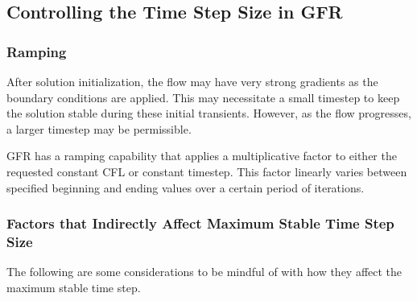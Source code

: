 \subsection{Controlling the Time Step Size in GFR}
\label{SEC:Time:Controlling}


\subsubsection{Ramping}
\label{SEC:Time:Controlling:Ramping}


After solution initialization, the flow may have very strong gradients
as the boundary conditions are applied.
%
This may necessitate a small timestep to keep the solution stable
during these initial transients.
%
However, as the flow progresses, a larger timestep may be permissible.

GFR has a ramping capability that applies a multiplicative factor to
either the requested constant CFL or constant timestep.
%
This factor linearly varies between specified beginning and ending
values over a certain period of iterations.



\subsubsection{Factors that Indirectly Affect Maximum Stable Time Step Size}%
\label{SEC:Time:Controlling:Indirectly}

The following are some considerations to be mindful of with how they affect the
maximum stable time step.

